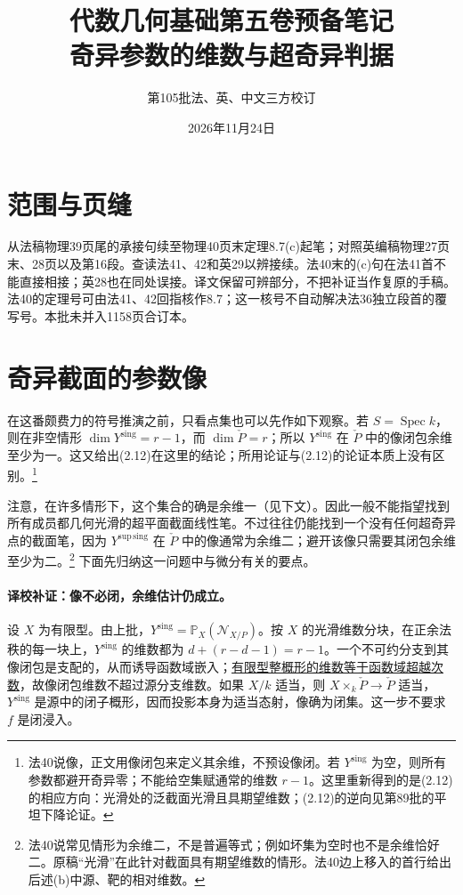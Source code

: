 \documentclass[openany,fontset=fandol]{ctexbook}
\newcommand{\PP}{\mathbb P}
\newcommand{\Ysing}{Y^{\mathrm{sing}}}
\newcommand{\Ysup}{Y^{\mathrm{sup\,sing}}}
\newcommand{\Pdual}{\check P}
\begin{document}
\title{代数几何基础第五卷预备笔记\\奇异参数的维数与超奇异判据}
\author{第105批\quad 法、英、中文三方校订}
\date{2026年11月24日}
\maketitle

\section*{范围与页缝}
从法稿物理39页尾的承接句续至物理40页末定理8.7(c)起笔；对照英编稿物理27页末、28页以及第16段。查读法41、42和英29以辨接续。法40末的(c)句在法41首不能直接相接；英28也在同处误接。译文保留可辨部分，不把补证当作复原的手稿。法40的定理号可由法41、42回指核作8.7；这一核号不自动解决法36独立段首的覆写号。本批未并入1158页合订本。
 
\section*{奇异截面的参数像}
在这番颇费力的符号推演之前，只看点集也可以先作如下观察。若 $S=\operatorname{Spec} k$，则在非空情形 $\dim\Ysing=r-1$，而 $\dim\Pdual=r$；所以 $\Ysing$ 在 $\Pdual$ 中的像闭包余维至少为一。这又给出(2.12)在这里的结论；所用论证与(2.12)的论证本质上没有区别。\footnote{法40说像，正文用像闭包来定义其余维，不预设像闭。若 $\Ysing$ 为空，则所有参数都避开奇异零；不能给空集赋通常的维数 $r-1$。这里重新得到的是(2.12)的相应方向：光滑处的泛截面光滑且具期望维数；(2.12)的逆向见第89批的平坦下降论证。}

注意，在许多情形下，这个集合的确是余维一（见下文）。因此一般不能指望找到所有成员都几何光滑的超平面截面线性笔。不过往往仍能找到一个没有任何超奇异点的截面笔，因为 $\Ysup$ 在 $\Pdual$ 中的像通常为余维二；避开该像只需要其闭包余维至少为二。\footnote{法40说常见情形为余维二，不是普遍等式；例如坏集为空时也不是余维恰好二。原稿“光滑”在此针对截面具有期望维数的情形。法40边上移入的首行给出后述(b)中源、靶的相对维数。} 下面先归纳这一问题中与微分有关的要点。

\paragraph{译校补证：像不必闭，余维估计仍成立。}
设 $X$ 为有限型。由上批，$\Ysing=\PP_X(\mathcal N_{X/P})$。按 $X$ 的光滑维数分块，在正余法秩的每一块上，$\Ysing$ 的维数都为 $d+(r-d-1)=r-1$。一个不可约分支到其像闭包是支配的，从而诱导函数域嵌入；\href{https://stacks.math.columbia.edu/tag/0A21}{有限型整概形的维数等于函数域超越次数}，故像闭包维数不超过源分支维数。如果 $X/k$ 适当，则 $X\times_k\Pdual\to\Pdual$ 适当，$\Ysing$ 是源中的闭子概形，因而投影本身为适当态射，像确为闭集。这一步不要求 $f$ 是闭浸入。
\end{document}
